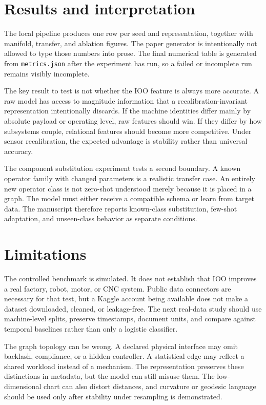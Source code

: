 \documentclass[11pt]{article}
\begin{document}
\section{Results and interpretation}

The local pipeline produces one row per seed and representation, together with manifold, transfer, and ablation figures. The paper generator is intentionally not allowed to type those numbers into prose. The final numerical table is generated from \texttt{metrics.json} after the experiment has run, so a failed or incomplete run remains visibly incomplete.

The key result to test is not whether the IOO feature is always more accurate. A raw model has access to magnitude information that a recalibration-invariant representation intentionally discards. If the machine identities differ mainly by absolute payload or operating level, raw features should win. If they differ by how subsystems couple, relational features should become more competitive. Under sensor recalibration, the expected advantage is stability rather than universal accuracy.

The component substitution experiment tests a second boundary. A known operator family with changed parameters is a realistic transfer case. An entirely new operator class is not zero-shot understood merely because it is placed in a graph. The model must either receive a compatible schema or learn from target data. The manuscript therefore reports known-class substitution, few-shot adaptation, and unseen-class behavior as separate conditions.

\section{Limitations}

The controlled benchmark is simulated. It does not establish that IOO improves a real factory, robot, motor, or CNC system. Public data connectors are necessary for that test, but a Kaggle account being available does not make a dataset downloaded, cleaned, or leakage-free. The next real-data study should use machine-level splits, preserve timestamps, document units, and compare against temporal baselines rather than only a logistic classifier.

The graph topology can be wrong. A declared physical interface may omit backlash, compliance, or a hidden controller. A statistical edge may reflect a shared workload instead of a mechanism. The representation preserves these distinctions in metadata, but the model can still misuse them. The low-dimensional chart can also distort distances, and curvature or geodesic language should be used only after stability under resampling is demonstrated.
\end{document}
